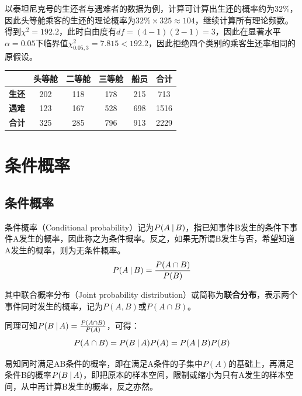 \documentclass[11pt]{article}
\begin{document}
\begin{example}
    以泰坦尼克号的生还者与遇难者的数据为例，计算可计算出生还的概率约为$32\%$，因此头等舱乘客的生还的理论概率为$32\%\times 325 \approx 104$，继续计算所有理论频数。得到$\chi^2 = 192.2$，此时自由度有$df=(4-1)(2-1)=3$，因此在显著水平$\alpha=0.05$下临界值$\chi^2_{0.05,3} = 7.815 < 192.2$，因此拒绝四个类别的乘客生还率相同的原假设。
    \begin{table}[H]
    \centering
    \begin{tabular}{@{}cccccc@{}}
    \toprule
    & \textbf{头等舱} & \textbf{二等舱} & \textbf{三等舱} & \textbf{船员} & \textbf{合计} \\ \midrule
    \textbf{生还} & 202 & 118 & 178 & 215 & 713 \\
    \textbf{遇难} & 123 & 167 & 528 & 698 & 1516 \\
    \textbf{合计} & 325 & 285 & 796 & 913 & 2229 \\ \bottomrule
    \end{tabular}
    \end{table}
\end{example}

\section{条件概率}

\subsection{条件概率}

条件概率（Conditional probability）记为$P(A\:\vert\, B)$，指已知事件B发生的条件下事件A发生的概率，因此称之为条件概率。反之，如果无所谓B发生与否，希望知道A发生的概率，则为无条件概率。
\begin{equation*}
    P(A \:\vert\, B) = \frac{P(A \cap B)}{P(B)}
\end{equation*}

其中联合概率分布（Joint probability distribution）或简称为\textbf{联合分布}，表示两个事件同时发生的概率，记为$P(A,B)$或$P(A\cap B)$。

\begin{property}
    同理可知$P(B\:\vert\, A) = \frac{P(A \cap B)}{P(A)}$，可得：
    \begin{equation*}
        P(A \cap B) = P(B\:\vert\, A)P(A) = P(A\:\vert\, B)P(B)
    \end{equation*}
    
    易知同时满足AB条件的概率，即在满足A条件的子集中$P(A)$的基础上，再满足条件B的概率$P(B \:\vert\, A)$，即把原本的样本空间，限制或缩小为只有A发生的样本空间，从中再计算B发生的概率，反之亦然。
\end{property}
\end{document}
